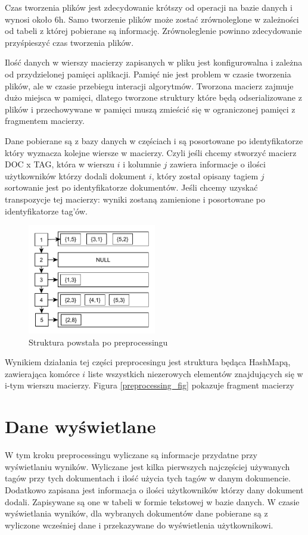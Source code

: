 \documentclass[11pt,a4paper]{report}
\begin{document}
Czas tworzenia plików jest zdecydowanie krótszy od operacji na bazie danych i wynosi około 6h. Samo tworzenie plików może zostać zrównoleglone w zależności od tabeli z której pobierane są informację. Zrównoleglenie powinno zdecydowanie przyśpieszyć czas tworzenia plików. 

Ilość danych w wierszy macierzy zapisanych w pliku jest konfigurowalna i zależna od przydzielonej pamięci aplikacji. Pamięć nie jest problem w czasie tworzenia plików, ale w czasie przebiegu interacji algorytmów. Tworzona macierz zajmuje dużo miejsca w pamięci, dlatego tworzone struktury które będą odserializowane z plików i przechowywane w pamięci muszą zmieścić się w ograniczonej pamięci z fragmentem macierzy.


Dane pobierane są z bazy danych w częściach i są posortowane po identyfikatorze który wyznacza kolejne wiersze w macierzy. Czyli jeśli chcemy stworzyć macierz DOC x  TAG, która w wierszu $i$ i kolumnie $j$ zawiera informacje o ilości użytkowników którzy dodali dokument $i$, który został opisany tagiem $j$ sortowanie jest po identyfikatorze dokumentów. Jeśli chcemy uzyskać transpozycje tej macierzy: wyniki zostaną zamienione i posortowane po identyfikatorze tag'ów. 

\begin{figure}[htb]
\centering
\includegraphics[width=0.5\textwidth]{file_processing.pdf}
\caption{Struktura powstała po preprocessingu}
\label{fig:preprocessing_fig}
\end{figure}

Wynikiem działania tej części preprocesingu jest struktura będąca HashMapą, zawierająca komórce $i$ liste wszystkich niezerowych elementów znajdujących się w i-tym wierszu macierzy. Figura \ref{preprocessing_fig} pokazuje fragment macierzy



\section{Dane wyświetlane}
W tym kroku preprocessingu wyliczane są informacje przydatne przy wyświetlaniu wyników. Wyliczane jest kilka pierwszych najczęściej używanych tagów przy tych dokumentach i ilość użycia tych tagów w danym dokumencie. Dodatkowo zapisana jest informacja o ilości użytkowników którzy dany dokument dodali. Zapisywane są one w tabeli w formie tekstowej w bazie danych. W czasie wyświetlania wyników, dla wybranych dokumentów dane pobierane są z wyliczone wcześniej dane i przekazywane do wyświetlenia użytkownikowi. 
\end{document}
